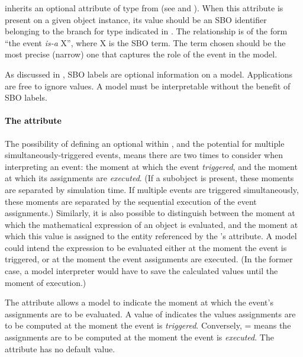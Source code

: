 \Event inherits an optional  attribute of type
 from \SBase (see
 and ).  When this
attribute is present on a given \Event object instance, its value
should be an SBO identifier belonging to the branch for type
\Event indicated in .  The
relationship is of the form ``the event \emph{is-a} X'', where X
is the SBO term.  The term chosen should be the most precise
(narrow) one that captures the role of the event in the model.

As discussed in , SBO labels are optional
information on a model.  Applications are free to ignore
 values.  A model must be interpretable without the
benefit of SBO labels.


\paragraph{\textcolor{black}{The  attribute}}
\label{sec:event-usevaluesfromtriggertime}

The possibility of defining an optional \Delay within \Event, and
the potential for multiple simultaneously-triggered events, means
there are two times to consider when interpreting an event: the
moment at which the event \emph{triggered}, and the moment at
which its assignments are \emph{executed}.  (If a \Delay subobject
is present, these moments are separated by simulation time.  If
multiple events are triggered simultaneously, these moments are
separated by the sequential execution of the event assignments.)
Similarly, it is also possible to distinguish between the moment at
which the mathematical expression of an \EventAssignment object is
evaluated, and the moment at which this value is assigned to the
entity referenced by the \EventAssignment's 
attribute.  A model could intend the \EventAssignment expression
to be evaluated either at the moment the event is triggered, or at
the moment the event assignments are executed.  (In the former case,
a model interpreter would have to save the calculated values until
the moment of execution.)

The attribute  allows a model to
indicate the moment at which the event's assignments are to be
evaluated.  A value of  indicates the values assignments
are to be computed at the moment the event is \emph{triggered}.
Conversely, = means the
assignments are to be computed at the moment the event is
\emph{executed}.  The attribute has no default value.


